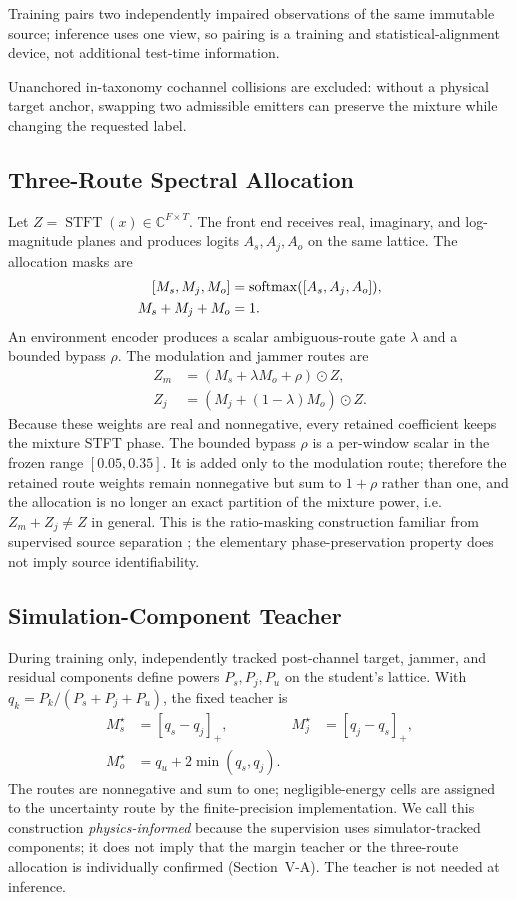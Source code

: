 \documentclass[letterpaper,journal]{IEEEtran}
\newcommand{\STFT}{\operatorname{STFT}}
\newcommand{\softmax}{\operatorname{softmax}}
\begin{document}
Training pairs two
independently impaired observations of the same immutable source; inference
uses one view, so pairing is a training and statistical-alignment device,
not additional test-time information.

Unanchored in-taxonomy cochannel collisions are excluded: without a physical
target anchor, swapping two admissible emitters can preserve the mixture
while changing the requested label.

\subsection{Three-Route Spectral Allocation}
Let $Z=\STFT(x)\in\mathbb{C}^{F\times T}$. The front end receives real,
imaginary, and log-magnitude planes and produces logits $A_s,A_j,A_o$ on the
same lattice. The allocation masks are
\begin{equation}
\begin{aligned}
\relax[M_s,M_j,M_o]&=\softmax([A_s,A_j,A_o]),\\
M_s+M_j+M_o&=1.
\end{aligned}
\end{equation}
An environment encoder produces a scalar ambiguous-route gate $\lambda$ and a
bounded bypass $\rho$. The modulation and jammer routes are
\begin{align}
Z_m&=(M_s+\lambda M_o+\rho)\odot Z,\\
Z_j&=(M_j+(1-\lambda)M_o)\odot Z.
\end{align}
Because these weights are real and nonnegative, every retained coefficient
keeps the mixture STFT phase. The bounded bypass $\rho$ is a per-window scalar
in the frozen range $[0.05,0.35]$. It is added only to the modulation route;
therefore the retained route weights remain nonnegative but sum to $1+\rho$
rather than one, and the allocation is no longer an exact partition of the
mixture power, i.e.\ $Z_m+Z_j\neq Z$ in general. This is the ratio-masking
construction familiar
from supervised source separation \cite{narayanan2013irm,wang2014targets,
erdogan2015psm,williamson2016cirm}; the elementary phase-preservation
property does not imply source identifiability.

\subsection{Simulation-Component Teacher}
During training only, independently tracked post-channel target, jammer, and
residual components define powers $P_s,P_j,P_u$ on the student's lattice. With
$q_k=P_k/(P_s+P_j+P_u)$, the fixed teacher is
\begin{align}
M_s^\star&=[q_s-q_j]_+, & M_j^\star&=[q_j-q_s]_+,\\
M_o^\star&=q_u+2\min(q_s,q_j).
\label{eq:teacher}
\end{align}
The routes are nonnegative and sum to one; negligible-energy cells are assigned
to the uncertainty route by the finite-precision implementation. We call this
construction \emph{physics-informed} because the supervision uses
simulator-tracked components; it does not imply that the margin teacher or the
three-route allocation is individually confirmed (Section~V-A). The teacher is
not needed at inference.
\end{document}
